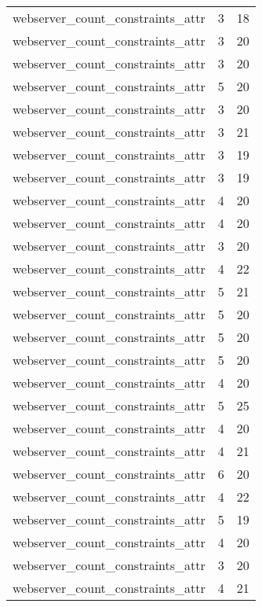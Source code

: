 \begin{table}
\begin{tabular}{lrr}
webserver\_count\_constraints\_attr &         3 &        18 \\
webserver\_count\_constraints\_attr &         3 &        20 \\
webserver\_count\_constraints\_attr &         3 &        20 \\
webserver\_count\_constraints\_attr &         5 &        20 \\
webserver\_count\_constraints\_attr &         3 &        20 \\
webserver\_count\_constraints\_attr &         3 &        21 \\
webserver\_count\_constraints\_attr &         3 &        19 \\
webserver\_count\_constraints\_attr &         3 &        19 \\
webserver\_count\_constraints\_attr &         4 &        20 \\
webserver\_count\_constraints\_attr &         4 &        20 \\
webserver\_count\_constraints\_attr &         3 &        20 \\
webserver\_count\_constraints\_attr &         4 &        22 \\
webserver\_count\_constraints\_attr &         5 &        21 \\
webserver\_count\_constraints\_attr &         5 &        20 \\
webserver\_count\_constraints\_attr &         5 &        20 \\
webserver\_count\_constraints\_attr &         5 &        20 \\
webserver\_count\_constraints\_attr &         4 &        20 \\
webserver\_count\_constraints\_attr &         5 &        25 \\
webserver\_count\_constraints\_attr &         4 &        20 \\
webserver\_count\_constraints\_attr &         4 &        21 \\
webserver\_count\_constraints\_attr &         6 &        20 \\
webserver\_count\_constraints\_attr &         4 &        22 \\
webserver\_count\_constraints\_attr &         5 &        19 \\
webserver\_count\_constraints\_attr &         4 &        20 \\
webserver\_count\_constraints\_attr &         3 &        20 \\
webserver\_count\_constraints\_attr &         4 &        21 \\

\end{tabular}
\end{table}
